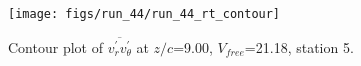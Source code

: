 \begin{figure}[H]
\centering
\texttt{[image: figs/run\_44/run\_44\_rt\_contour]}
\caption{Contour plot of $\overline{v_{r}^{\prime} v_{\theta}^{\prime}}$ at $z/c$=9.00, $V_{free}$=21.18, station 5.}
\label{fig:run_44_rt_contour}
\end{figure}


